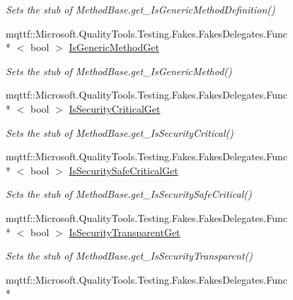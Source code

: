 \begin{DoxyCompactItemize}
\begin{DoxyCompactList}\small\item\em Sets the stub of Method\-Base.\-get\-\_\-\-Is\-Generic\-Method\-Definition()\end{DoxyCompactList}\item 
mqttf\-::\-Microsoft.\-Quality\-Tools.\-Testing.\-Fakes.\-Fakes\-Delegates.\-Func\\*
$<$ bool $>$ \hyperlink{class_system_1_1_reflection_1_1_fakes_1_1_stub_method_base_a425365d0f54d923fb17fc0b6cf806d0d}{Is\-Generic\-Method\-Get}
\begin{DoxyCompactList}\small\item\em Sets the stub of Method\-Base.\-get\-\_\-\-Is\-Generic\-Method()\end{DoxyCompactList}\item 
mqttf\-::\-Microsoft.\-Quality\-Tools.\-Testing.\-Fakes.\-Fakes\-Delegates.\-Func\\*
$<$ bool $>$ \hyperlink{class_system_1_1_reflection_1_1_fakes_1_1_stub_method_base_a45d83070c51d7f26e3834273b35fccf7}{Is\-Security\-Critical\-Get}
\begin{DoxyCompactList}\small\item\em Sets the stub of Method\-Base.\-get\-\_\-\-Is\-Security\-Critical()\end{DoxyCompactList}\item 
mqttf\-::\-Microsoft.\-Quality\-Tools.\-Testing.\-Fakes.\-Fakes\-Delegates.\-Func\\*
$<$ bool $>$ \hyperlink{class_system_1_1_reflection_1_1_fakes_1_1_stub_method_base_abed9eae85aa84e74831729f07880f02c}{Is\-Security\-Safe\-Critical\-Get}
\begin{DoxyCompactList}\small\item\em Sets the stub of Method\-Base.\-get\-\_\-\-Is\-Security\-Safe\-Critical()\end{DoxyCompactList}\item 
mqttf\-::\-Microsoft.\-Quality\-Tools.\-Testing.\-Fakes.\-Fakes\-Delegates.\-Func\\*
$<$ bool $>$ \hyperlink{class_system_1_1_reflection_1_1_fakes_1_1_stub_method_base_aa6285b38b24551f3e72a61b0f9ebaaab}{Is\-Security\-Transparent\-Get}
\begin{DoxyCompactList}\small\item\em Sets the stub of Method\-Base.\-get\-\_\-\-Is\-Security\-Transparent()\end{DoxyCompactList}\item 
mqttf\-::\-Microsoft.\-Quality\-Tools.\-Testing.\-Fakes.\-Fakes\-Delegates.\-Func\\*

\end{DoxyCompactItemize}
